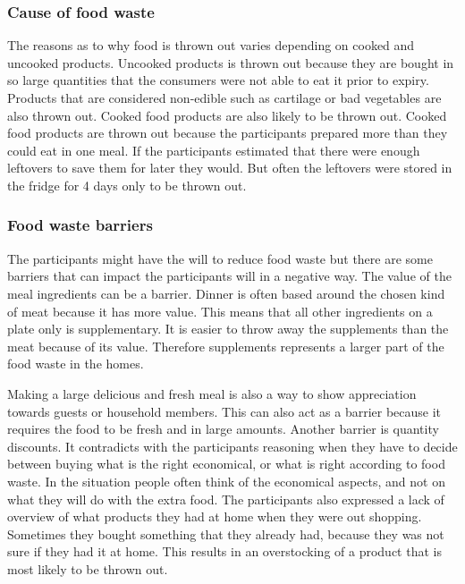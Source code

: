 \subsubsection{Cause of food waste} 
The reasons as to why food is thrown out varies depending on cooked and uncooked products. Uncooked products is thrown out because they are bought in so large quantities that the consumers were not able to eat it prior to expiry. Products that are considered non-edible such as cartilage or bad vegetables are also thrown out. Cooked food products are also likely to be thrown out. Cooked food products are thrown out because the participants prepared more than they could eat in one meal. If the participants estimated that there were enough leftovers to save them for later they would. But often the leftovers were stored in the fridge for 4 days only to be thrown out.

\subsubsection{Food waste barriers}
The participants might have the will to reduce food waste but there are some barriers that can impact the participants will in a negative way. The value of the meal ingredients can be a barrier. Dinner is often based around the chosen kind of meat because it has more value. This means that all other ingredients on a plate only is supplementary. It is easier to throw away the supplements than the meat because of its value. Therefore supplements represents a larger part of the food waste in the homes.

Making a large delicious and fresh meal is also a way to show appreciation towards guests or household members. This can also act as a barrier because it requires the food to be fresh and in large amounts. Another barrier is quantity discounts. It contradicts with the participants reasoning when they have to decide between buying what is the right economical, or what is right according to food waste. In the situation people often think of the economical aspects, and not on what they will do with the extra food. The participants also expressed a lack of overview of what products they had at home when they were out shopping. Sometimes they bought something that they already had, because they was not sure if they had it at home. This results in an overstocking of a product that is most likely to be thrown out.

